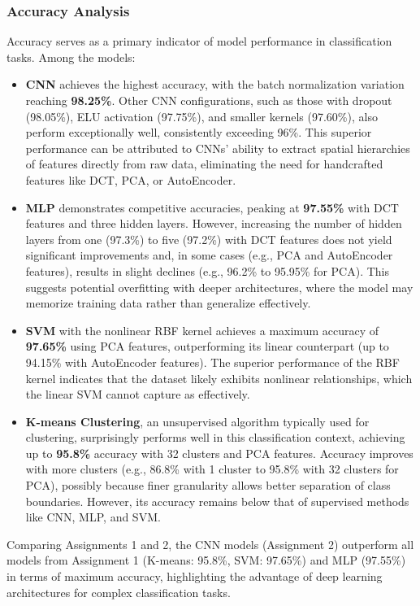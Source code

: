 \documentclass[a4paper,12pt]{article}
\begin{document}
\subsubsection{Accuracy Analysis}
Accuracy serves as a primary indicator of model performance in classification tasks. Among the models:

\begin{itemize}
    \item \textbf{CNN} achieves the highest accuracy, with the batch normalization variation reaching \textbf{98.25\%}. Other CNN configurations, such as those with dropout (98.05\%), ELU activation (97.75\%), and smaller kernels (97.60\%), also perform exceptionally well, consistently exceeding 96\%. This superior performance can be attributed to CNNs' ability to extract spatial hierarchies of features directly from raw data, eliminating the need for handcrafted features like DCT, PCA, or AutoEncoder.
    
    \item \textbf{MLP} demonstrates competitive accuracies, peaking at \textbf{97.55\%} with DCT features and three hidden layers. However, increasing the number of hidden layers from one (97.3\%) to five (97.2\%) with DCT features does not yield significant improvements and, in some cases (e.g., PCA and AutoEncoder features), results in slight declines (e.g., 96.2\% to 95.95\% for PCA). This suggests potential overfitting with deeper architectures, where the model may memorize training data rather than generalize effectively.
    
    \item \textbf{SVM} with the nonlinear RBF kernel achieves a maximum accuracy of \textbf{97.65\%} using PCA features, outperforming its linear counterpart (up to 94.15\% with AutoEncoder features). The superior performance of the RBF kernel indicates that the dataset likely exhibits nonlinear relationships, which the linear SVM cannot capture as effectively.
    
    \item \textbf{K-means Clustering}, an unsupervised algorithm typically used for clustering, surprisingly performs well in this classification context, achieving up to \textbf{95.8\%} accuracy with 32 clusters and PCA features. Accuracy improves with more clusters (e.g., 86.8\% with 1 cluster to 95.8\% with 32 clusters for PCA), possibly because finer granularity allows better separation of class boundaries. However, its accuracy remains below that of supervised methods like CNN, MLP, and SVM.\\
\end{itemize}
Comparing Assignments 1 and 2, the CNN models (Assignment 2) outperform all models from Assignment 1 (K-means: 95.8\%, SVM: 97.65\%) and MLP (97.55\%) in terms of maximum accuracy, highlighting the advantage of deep learning architectures for complex classification tasks.
\end{document}
